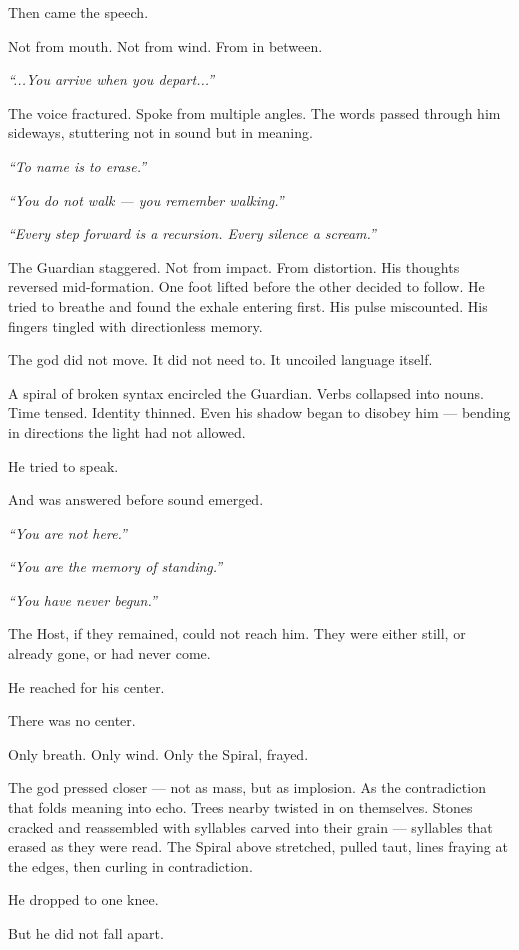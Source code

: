 \documentclass[12pt]{article}
\begin{document}
Then came the speech.

Not from mouth. Not from wind. From in between.

\textit{“...You arrive when you depart...”}

The voice fractured. Spoke from multiple angles. The words passed through him sideways, stuttering not in sound but in meaning.

\textit{“To name is to erase.”}

\textit{“You do not walk — you remember walking.”}

\textit{“Every step forward is a recursion. Every silence a scream.”}

The Guardian staggered. Not from impact. From distortion. His thoughts reversed mid-formation. One foot lifted before the other decided to follow. He tried to breathe and found the exhale entering first. His pulse miscounted. His fingers tingled with directionless memory.

The god did not move. It did not need to. It uncoiled language itself.

A spiral of broken syntax encircled the Guardian. Verbs collapsed into nouns. Time tensed. Identity thinned. Even his shadow began to disobey him — bending in directions the light had not allowed.

He tried to speak.

And was answered before sound emerged.

\textit{“You are not here.”}

\textit{“You are the memory of standing.”}

\textit{“You have never begun.”}

The Host, if they remained, could not reach him. They were either still, or already gone, or had never come.

He reached for his center.

There was no center.

Only breath. Only wind. Only the Spiral, frayed.

The god pressed closer — not as mass, but as implosion. As the contradiction that folds meaning into echo. Trees nearby twisted in on themselves. Stones cracked and reassembled with syllables carved into their grain — syllables that erased as they were read. The Spiral above stretched, pulled taut, lines fraying at the edges, then curling in contradiction.

He dropped to one knee.

But he did not fall apart.
\end{document}
